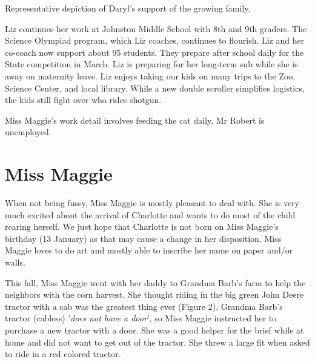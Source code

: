 \documentclass[letterpaper,11pt]{article}
\makeatletter
\newenvironment{figurehere}
  {\def\@captype{figure}}
  {}
\makeatother
\begin{document}
\begin{multicols}{2}
\begin{figurehere}
 \centering   
 \caption{Representative depiction of Daryl's support of the growing family.}
\end{figurehere}

Liz continues her work at Johnston Middle School with 8th and 9th graders. 
The Science Olympiad program, which Liz coaches, continues to flourish. 
Liz and her co-coach now support about 95 students.  They prepare
after school daily for the State competition in March.  Liz is preparing for
her long-term sub while she is away on maternity leave.
Liz enjoys taking our kids on many trips to the Zoo, Science Center, and local
library. While a new double scroller simplifies logistics, the kids
still fight over who rides shotgun.

Miss Maggie's work detail involves feeding the cat daily.  Mr Robert is
unemployed.

\section{Miss Maggie}

When not being fussy, Miss Maggie is mostly pleasant to deal with.  She is very
much excited about the arrival of Charlotte and wants to do most of the child
rearing herself. We just hope that Charlotte is not born on Miss Maggie's
birthday (13 January) as that may cause a change in her disposition.  Miss
Maggie loves to do art and mostly able to inscribe her name on paper and/or walls.

This fall, Miss Maggie went with her daddy to Grandma Barb's farm to help the
neighbors with the corn harvest.  She thought riding in the big green John Deere
tractor with a cab was the greatest thing ever (Figure 2).  Grandma Barb's
tractor (cabless) '\textit{does not have a door}', so Miss Maggie instructed her
to purchase a new tractor with a door.  She was a good helper for the brief
while at home and did not want to get out of the tractor. She threw a large fit
when asked to ride in a red colored tractor.


\end{multicols}
\end{document}
